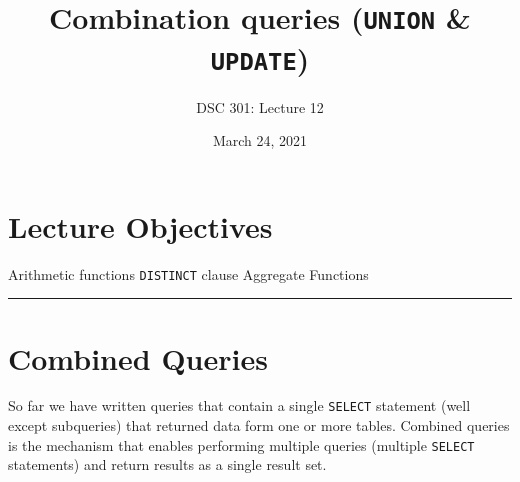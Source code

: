 \documentclass{article}
\newtheorem{definition}{Definition}
\begin{document}
\title{Combination queries (\texttt{UNION} \&  \texttt{UPDATE})}
\author{DSC 301: Lecture 12}
\date{March 24, 2021} %
\maketitle





\begin{outline}[enumerate]

\end{outline}
\begin{outline}
        
\end{outline}




\section*{Lecture Objectives}
\begin{outline}
        \1  Arithmetic functions
        \1  \texttt{DISTINCT} clause
        \1  Aggregate Functions
       
       
        

\end{outline}

\hspace{-0.5cm}\rule[-0.101in]{\textwidth}{0.0025in}
% 
% 









\section*{Combined Queries}
 
So far we have written queries that contain a single \texttt{SELECT} statement (well except subqueries) that returned data form one or more tables.  Combined queries is the mechanism that enables performing multiple queries (multiple \texttt{SELECT} statements) and return results as a single result set.  
\end{document}
